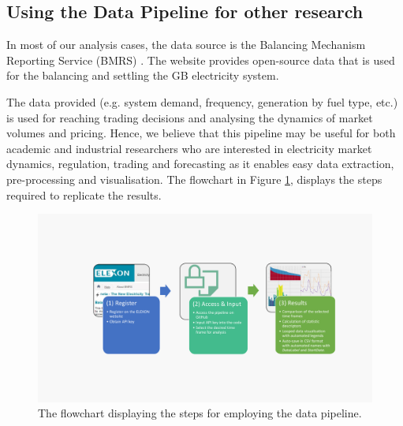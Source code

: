 \documentclass[energies,article,submit,moreauthors,pdftex]{Definitions/mdpi}
\begin{document}
\subsection{Using the Data Pipeline for other research}
In most of our analysis cases, the data source is the Balancing Mechanism Reporting Service (BMRS) \cite{Elexon2019BMRSArchitecture}. The website \cite{ElectricityBMRS} provides open-source data that is used for the balancing and settling the GB electricity system.

The data provided (e.g. system  demand, frequency, generation by fuel type, etc.) is used for reaching trading decisions and analysing the dynamics of market volumes and pricing. Hence, we believe that this pipeline may be useful for both academic and industrial researchers who are interested in electricity market dynamics, regulation, trading and forecasting as it enables easy data extraction, pre-processing and visualisation. The flowchart in Figure \ref{fig:pipeline_flowchart}, displays the steps required to replicate the results.


\begin{figure}[H]
\centering
\hspace{-25pt}\includegraphics[trim={4cm 2.5cm 3cm 3cm}, clip, width=15 cm]{Graphics/Flowchart_pipeline.pdf}
\caption{The flowchart displaying the steps for employing the data pipeline.}\label{fig:pipeline_flowchart}
\end{figure}  
\end{document}
